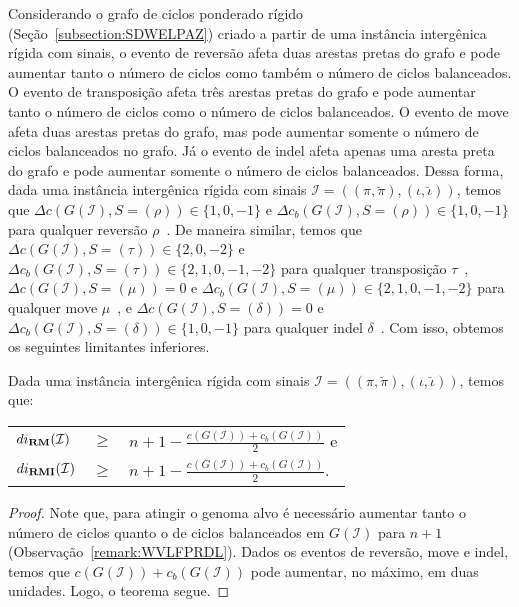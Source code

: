 Considerando o grafo de ciclos ponderado rígido (Seção~\ref{subsection:SDWELPAZ}) criado a partir de uma instância intergênica rígida com sinais, o evento de reversão afeta duas arestas pretas do grafo e pode aumentar tanto o número de ciclos como também o número de ciclos balanceados. O evento de transposição afeta três arestas pretas do grafo e pode aumentar tanto o número de ciclos como o número de ciclos balanceados. O evento de move afeta duas arestas pretas do grafo, mas pode aumentar somente o número de ciclos balanceados no grafo. Já o evento de indel afeta apenas uma aresta preta do grafo e pode aumentar somente o número de ciclos balanceados. Dessa forma, dada uma instância intergênica rígida com sinais $\mathcal{I} = ((\pi,\breve\pi),(\iota,\breve\iota))$, temos que $\Delta c(G(\mathcal{I}), S=(\rho)) \in \{1,0,-1\}$ e $\Delta c_b(G(\mathcal{I}), S=(\rho)) \in \{1,0,-1\}$ para qualquer reversão $\rho$~\cite{1996-bafna-pevzner,2021b-oliveira-etal}. De maneira similar, temos que $\Delta c(G(\mathcal{I}), S=(\tau)) \in \{2,0,-2\}$ e $\Delta c_b(G(\mathcal{I}), S=(\tau)) \in \{2,1,0,{-1},{-2}\}$ para qualquer transposição $\tau$~\cite{1998-bafna-pevzner,2021a-oliveira-etal}, $\Delta c(G(\mathcal{I}), S=(\mu)) = 0$ e $\Delta c_b(G(\mathcal{I}), S=(\mu)) \in \{2,1,0,{-1},{-2}\}$ para qualquer move $\mu$~\cite{2021a-oliveira-etal}, e $\Delta c(G(\mathcal{I}), S=(\delta)) = 0$ e $\Delta c_b(G(\mathcal{I}), S=(\delta)) \in \{1,0,{-1}\}$ para qualquer indel $\delta$~\cite{2021b-oliveira-etal}. Com isso, obtemos os seguintes limitantes inferiores.

\begin{theorem}\label{theorem:OCNPWYNL}
Dada uma instância intergênica rígida com sinais $\mathcal{I} = ((\pi,\breve\pi),(\iota,\breve\iota))$, temos que:

\begin{tabular}{lll}
  $di_{\textbf{RM}}(\mathcal{I})$       & $ \ge $ & ${n + 1} - \frac{c(G(\mathcal{I})) + c_b(G(\mathcal{I}))}{2}$ e \\
  $di_{\textbf{RMI}}(\mathcal{I})$    & $ \ge $ & ${n + 1} - \frac{c(G(\mathcal{I})) + c_b(G(\mathcal{I}))}{2}$.    \\
\end{tabular}
\end{theorem}
\begin{proof}
Note que, para atingir o genoma alvo é necessário aumentar tanto o número de ciclos quanto o de ciclos balanceados em $G(\mathcal{I})$ para $n+1$ (Observação~\ref{remark:WVLFPRDL}). Dados os eventos de reversão, move e indel, temos que $c(G(\mathcal{I})) + c_b(G(\mathcal{I}))$ pode aumentar, no máximo, em duas unidades. Logo, o teorema segue.
\end{proof}

